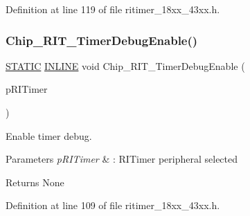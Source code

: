 Definition at line 119 of file ritimer\+\_\+18xx\+\_\+43xx.\+h.

\mbox{\label{group___r_i_t_i_m_e_r__18_x_x__43_x_x_gafc64603f85a635e7c6ebe67346fdafe4}} 
\subsubsection{\texorpdfstring{Chip\+\_\+\+R\+I\+T\+\_\+\+Timer\+Debug\+Enable()}{Chip\_RIT\_TimerDebugEnable()}}
{\footnotesize\ttfamily \hyperlink{group___l_p_c___types___public___macros_ga10b2d890d871e1489bb02b7e70d9bdfb}{S\+T\+A\+T\+IC} \hyperlink{spifi__18xx__43xx_8h_a2eb6f9e0395b47b8d5e3eeae4fe0c116}{I\+N\+L\+I\+NE} void Chip\+\_\+\+R\+I\+T\+\_\+\+Timer\+Debug\+Enable (\begin{DoxyParamCaption}\item[{\hyperlink{struct_l_p_c___r_i_t_i_m_e_r___t}{L\+P\+C\+\_\+\+R\+I\+T\+I\+M\+E\+R\+\_\+T} $\ast$}]{p\+R\+I\+Timer }\end{DoxyParamCaption})}



Enable timer debug. 


\begin{DoxyParams}{Parameters}
{\em p\+R\+I\+Timer} & \+: R\+I\+Timer peripheral selected \\
\hline
\end{DoxyParams}
\begin{DoxyReturn}{Returns}
None 
\end{DoxyReturn}


Definition at line 109 of file ritimer\+\_\+18xx\+\_\+43xx.\+h.

